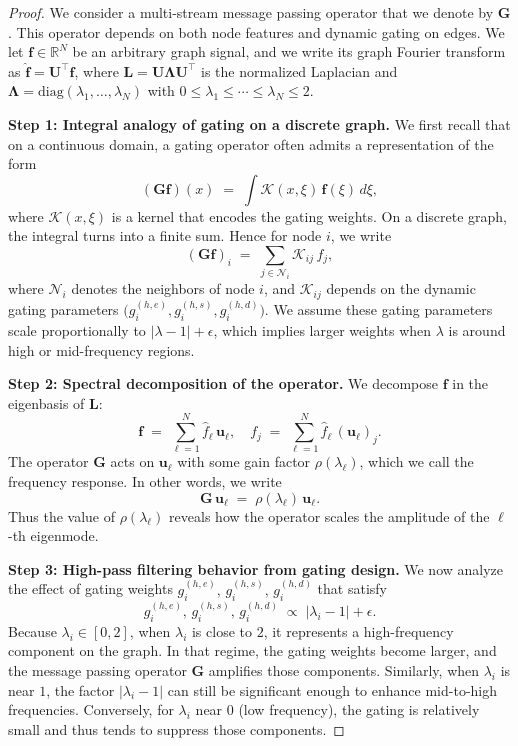 \begin{proof}
We consider a multi-stream message passing operator that we denote by 
$\mathbf{G}$. 
This operator depends on both node features and dynamic gating on edges. 
We let $\mathbf{f} \in \mathbb{R}^N$ be an arbitrary graph signal, and we 
write its graph Fourier transform as 
$\hat{\mathbf{f}} = \mathbf{U}^\top \mathbf{f}$, 
where 
$\mathbf{L} = \mathbf{U} \boldsymbol{\Lambda} \mathbf{U}^\top$ 
is the normalized Laplacian and 
$\boldsymbol{\Lambda} = \mathrm{diag}(\lambda_1, \ldots, \lambda_N)$ 
with 
$0 \le \lambda_1 \le \cdots \le \lambda_N \le 2$.

\textbf{Step 1: Integral analogy of gating on a discrete graph.}  
We first recall that on a continuous domain, a gating operator often admits a 
representation of the form
\[
(\mathbf{G}\mathbf{f})(x) 
\;=\; \int \mathcal{K}(x,\xi)\,\mathbf{f}(\xi)\,d\xi,
\]
where $\mathcal{K}(x,\xi)$ is a kernel that encodes the gating weights. 
On a discrete graph, the integral turns into a finite sum. 
Hence for node $i$, we write
\[
(\mathbf{G}\mathbf{f})_i 
\;=\; \sum_{j\in \mathcal{N}_i} \mathcal{K}_{ij}\,f_j,
\]
where $\mathcal{N}_i$ denotes the neighbors of node $i$, and 
$\mathcal{K}_{ij}$ depends on the dynamic gating parameters 
$\bigl(g^{(h,e)}_i, g^{(h,s)}_i, g^{(h,d)}_i\bigr)$. 
We assume these gating parameters scale proportionally to 
$\bigl|\lambda - 1\bigr| + \epsilon$, 
which implies larger weights when $\lambda$ is around high or mid-frequency 
regions.

\textbf{Step 2: Spectral decomposition of the operator.}  
We decompose $\mathbf{f}$ in the eigenbasis of $\mathbf{L}$:
\[
\mathbf{f} 
\;=\; \sum_{\ell=1}^N \hat{f}_\ell \,\mathbf{u}_\ell, 
\quad 
f_j 
\;=\; \sum_{\ell=1}^N \hat{f}_\ell\,(\mathbf{u}_\ell)_j.
\]
The operator $\mathbf{G}$ acts on $\mathbf{u}_\ell$ with some gain factor 
$\rho(\lambda_\ell)$, which we call the frequency response. 
In other words, we write
\[
\mathbf{G}\,\mathbf{u}_\ell 
\;=\; \rho(\lambda_\ell)\,\mathbf{u}_\ell.
\]
Thus the value of $\rho(\lambda_\ell)$ reveals how the operator scales 
the amplitude of the $\ell$-th eigenmode.

\textbf{Step 3: High-pass filtering behavior from gating design.}  
We now analyze the effect of gating weights 
$g^{(h,e)}_i,\, g^{(h,s)}_i,\, g^{(h,d)}_i$ 
that satisfy 
\[
g^{(h,e)}_i,\, g^{(h,s)}_i,\, g^{(h,d)}_i 
\;\propto\;
|\lambda_i - 1| + \epsilon.
\]
Because $\lambda_i \in [0,2]$, when $\lambda_i$ is close to $2$, it 
represents a high-frequency component on the graph. 
In that regime, the gating weights become larger, and the message passing 
operator $\mathbf{G}$ amplifies those components. 
Similarly, when $\lambda_i$ is near $1$, the factor $|\lambda_i - 1|$ 
can still be significant enough to enhance mid-to-high frequencies. 
Conversely, for $\lambda_i$ near $0$ (low frequency), 
the gating is relatively small and thus tends to suppress those components.


\end{proof}
